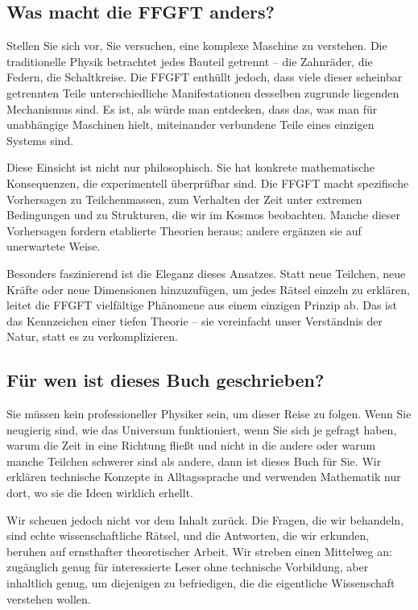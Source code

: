 \documentclass[11pt,openright,twoside]{book}
\begin{document}
\subsection*{Was macht die FFGFT anders?}

Stellen Sie sich vor, Sie versuchen, eine komplexe Maschine zu verstehen. Die traditionelle Physik betrachtet jedes Bauteil getrennt – die Zahnräder, die Federn, die Schaltkreise. Die FFGFT enthüllt jedoch, dass viele dieser scheinbar getrennten Teile unterschiedliche Manifestationen desselben zugrunde liegenden Mechanismus sind. Es ist, als würde man entdecken, dass das, was man für unabhängige Maschinen hielt, miteinander verbundene Teile eines einzigen Systems sind.

Diese Einsicht ist nicht nur philosophisch. Sie hat konkrete mathematische Konsequenzen, die experimentell überprüfbar sind. Die FFGFT macht spezifische Vorhersagen zu Teilchenmassen, zum Verhalten der Zeit unter extremen Bedingungen und zu Strukturen, die wir im Kosmos beobachten. Manche dieser Vorhersagen fordern etablierte Theorien heraus; andere ergänzen sie auf unerwartete Weise.

Besonders faszinierend ist die Eleganz dieses Ansatzes. Statt neue Teilchen, neue Kräfte oder neue Dimensionen hinzuzufügen, um jedes Rätsel einzeln zu erklären, leitet die FFGFT vielfältige Phänomene aus einem einzigen Prinzip ab. Das ist das Kennzeichen einer tiefen Theorie – sie vereinfacht unser Verständnis der Natur, statt es zu verkomplizieren.

\subsection*{Für wen ist dieses Buch geschrieben?}

Sie müssen kein professioneller Physiker sein, um dieser Reise zu folgen. Wenn Sie neugierig sind, wie das Universum funktioniert, wenn Sie sich je gefragt haben, warum die Zeit in eine Richtung fließt und nicht in die andere oder warum manche Teilchen schwerer sind als andere, dann ist dieses Buch für Sie. Wir erklären technische Konzepte in Alltagssprache und verwenden Mathematik nur dort, wo sie die Ideen wirklich erhellt.

Wir scheuen jedoch nicht vor dem Inhalt zurück. Die Fragen, die wir behandeln, sind echte wissenschaftliche Rätsel, und die Antworten, die wir erkunden, beruhen auf ernsthafter theoretischer Arbeit. Wir streben einen Mittelweg an: zugänglich genug für interessierte Leser ohne technische Vorbildung, aber inhaltlich genug, um diejenigen zu befriedigen, die die eigentliche Wissenschaft verstehen wollen.
\end{document}
